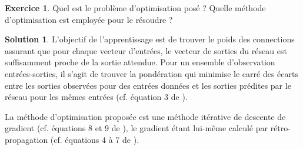 \documentclass[a4paper,francais]{article}
\theoremstyle{definition}
\newtheorem{exercice}{Exercice}[section]
\newtheorem*{solution}{Solution}
\begin{document}
\begin{exercice}
Quel est le problème d'optimisation posé ?
Quelle méthode d'optimisation est employée pour le résoudre ?
\end{exercice}

\begin{solution}
  L'objectif de l'apprentissage est de trouver le poids des connections assurant que
  pour chaque vecteur d'entrées, le vecteur de sorties du réseau est suffisamment proche
  de la sortie attendue. Pour un ensemble d'observation entrées-sorties, il s'agit de
  trouver la pondération qui minimise le carré des écarts entre les sorties observées
  pour des entrées données et les sorties prédites par le réseau pour les mêmes entrées
  (cf. équation 3 de \cite{hinton86}).

  La méthode d'optimisation proposée est une méthode itérative de descente de gradient
  (cf. équations 8 et 9 de \cite{hinton86}), le gradient étant lui-même calculé par
  rétro-propagation (cf. équations 4 à 7 de \cite{hinton86}).
\end{solution}



\end{document}
